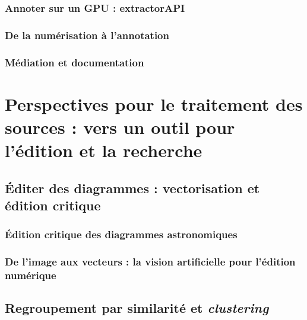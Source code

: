 \documentclass[a4paper,12pt,twoside]{book}
\newcommand{\clearemptydoublepage}{\newpage{\pagestyle{empty}\cleardoublepage}}
\begin{document}
                \section{Annoter sur un GPU : extractorAPI}
                    
            
                \section{De la numérisation à l’annotation}
                    
             
                \section{Médiation et documentation}
                    
            
        \clearemptydoublepage

    \part{Perspectives pour le traitement des sources : vers un outil pour l’édition et la recherche}
        \chapter[Éditer des diagrammes]{Éditer des diagrammes : vectorisation et édition critique}
                \section{Édition critique des diagrammes astronomiques}
                    
            
                \section[De l’image aux vecteurs]{De l’image aux vecteurs : la vision artificielle pour l’édition numérique}
                    
            
        \clearemptydoublepage
        
        \chapter{Regroupement par similarité et \textit{clustering}}
\end{document}
